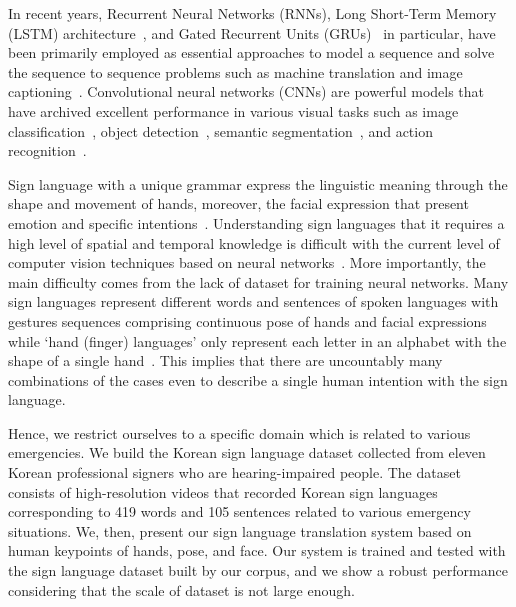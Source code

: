 \documentclass[10pt,twocolumn,letterpaper]{article}
\begin{document}
In recent years, Recurrent Neural Networks (RNNs), Long Short-Term Memory (LSTM) architecture~\cite{HochreiterS97}, and  Gated Recurrent Units (GRUs)~\cite{ChovGBBSB14} in particular, have been primarily employed as essential approaches to model a sequence and solve the sequence to sequence problems such as machine translation and image captioning~\cite{dai2017contrastive,liu2017attention,SutskeverVL14,xu2015show}. Convolutional neural networks (CNNs) are powerful models that have archived excellent performance in various visual tasks such as image classification~\cite{husqueeze,huang2017densely}, object detection~\cite{gao2017dynamic,redmon2016you}, semantic segmentation~\cite{long2015fully,zhang2018context}, and action recognition~\cite{donahue2015long,luvizon20182d}.

Sign language with a unique grammar express the linguistic meaning through the shape and movement of hands, moreover, the facial expression that present emotion and specific intentions~\cite{von2008significance}. Understanding sign languages that it requires a high level of spatial and temporal knowledge is difficult with the current level of computer vision techniques based on neural networks~\cite{DongLY15,ForsterSHKZPN12,gattupalli2016evaluation,KishoreSK14,KollerFN15,koller2017re,StarnerP95}.
More importantly, the main difficulty comes from the lack of dataset for training neural networks. Many sign languages represent different words and sentences of spoken languages with gestures sequences comprising continuous pose of hands and facial expressions while `hand (finger) languages' only represent each letter in an alphabet with the shape of a single hand~\cite{CamgozHKNB18}. This implies that there are uncountably many combinations of the cases even to describe a single human intention with the sign language.

Hence, we restrict ourselves to a specific domain which is related to various emergencies. We build the Korean sign language dataset collected from eleven Korean professional signers who are hearing-impaired people. The dataset consists of high-resolution videos that recorded Korean sign languages corresponding to 419 words and 105 sentences related to various emergency situations.
We, then, present our sign language translation system based on human keypoints of hands, pose, and face. Our system is trained and tested with the sign language dataset built by our corpus, and we show a robust performance considering that the scale of dataset is not large enough.
\end{document}
